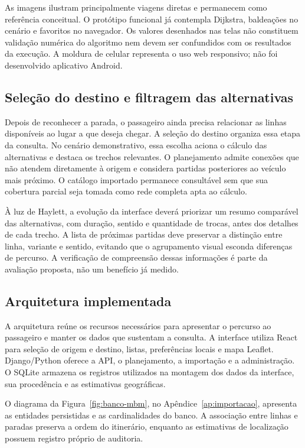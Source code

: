 \documentclass[12pt,oneside,a4paper,brazil]{abntex2}
\begin{document}
As imagens ilustram principalmente viagens diretas e permanecem como referência conceitual. O protótipo funcional já contempla Dijkstra, baldeações no cenário e favoritos no navegador. Os valores desenhados nas telas não constituem validação numérica do algoritmo nem devem ser confundidos com os resultados da execução. A moldura de celular representa o uso web responsivo; não foi desenvolvido aplicativo Android.

\clearpage
\subsection{Seleção do destino e filtragem das alternativas}
Depois de reconhecer a parada, o passageiro ainda precisa relacionar as linhas disponíveis ao lugar a que deseja chegar. A seleção do destino organiza essa etapa da consulta. No cenário demonstrativo, essa escolha aciona o cálculo das alternativas e destaca os trechos relevantes. O planejamento admite conexões que não atendem diretamente à origem e considera partidas posteriores ao veículo mais próximo. O catálogo importado permanece consultável sem que sua cobertura parcial seja tomada como rede completa apta ao cálculo.

À luz de Haylett, a evolução da interface deverá priorizar um resumo comparável das alternativas, com duração, sentido e quantidade de trocas, antes dos detalhes de cada trecho. A lista de próximas partidas deve preservar a distinção entre linha, variante e sentido, evitando que o agrupamento visual esconda diferenças de percurso. A verificação de compreensão dessas informações é parte da avaliação proposta, não um benefício já medido.

\subsection{Arquitetura implementada}
A arquitetura reúne os recursos necessários para apresentar o percurso ao passageiro e manter os dados que sustentam a consulta. A interface utiliza React para seleção de origem e destino, listas, preferências locais e mapa Leaflet. Django/Python oferece a API, o planejamento, a importação e a administração. O SQLite armazena os registros utilizados na montagem dos dados da interface, sua procedência e as estimativas geográficas.

O diagrama da Figura~\ref{fig:banco-mbm}, no Apêndice~\ref{ap:importacao}, apresenta as entidades persistidas e as cardinalidades do banco. A associação entre linhas e paradas preserva a ordem do itinerário, enquanto as estimativas de localização possuem registro próprio de auditoria.
\end{document}
